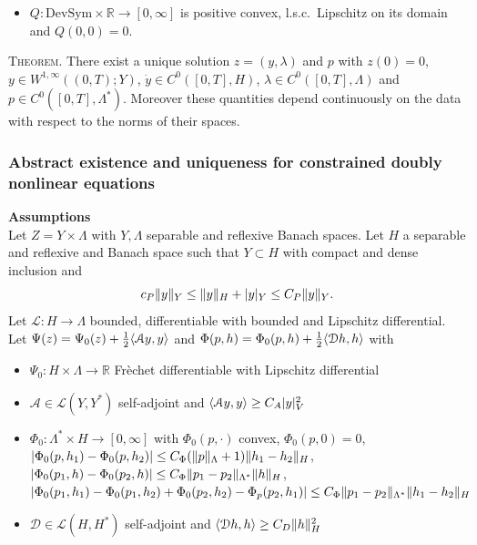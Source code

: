 \documentclass[8pt]{beamer}
\numberwithin{equation}{section}
\theoremstyle{definition}
\DeclarePairedDelimiter{\norm}{\lVert}{\rVert}
\DeclarePairedDelimiter{\dual}{\langle}{\rangle}
\begin{document}
\begin{frame}
{\begin{minipage}[c]{0.5\textwidth}
\begin{itemize}
\item[$\bullet$] $Q\colon\text{DevSym}\times\mathbb{R}\to[0,\infty]$ is positive convex, l.s.c.\, Lipschitz on its domain and $Q(0,0)=0$.
\end{itemize}
\vspace{0.5em}
\textsc{Theorem.} There exist a unique solution $z=(y,\lambda)$ and $p$ with $z(0)=0$, $y\in W^{1,\infty}((0,T);Y)$, $\dot y\in C^0([0,T],H)$, $\lambda\in C^0([0,T],\Lambda)$ and $p\in C^0([0,T],\Lambda^*)$. Moreover these quantities depend continuously on the data with respect to the norms of their spaces.
\end{minipage}
}
\end{frame}

\begin{frame}
\frametitle{Abstract existence and uniqueness for constrained doubly nonlinear equations}
\centering
\begin{minipage}[c]{0.7\textwidth}
\textbf{Assumptions}
\\[0.5ex]
Let $Z=Y\times\Lambda$ with $Y,\Lambda$ separable and reflexive Banach spaces. Let $H$ a separable and reflexive and Banach space such that $Y\subset H$ with compact and dense inclusion and
\[
c_P\norm{y}_Y\le\norm{y}_H+|y|_Y\le C_P\norm{y}_Y.
\]
Let $\mathscr{L}\colon H\to\Lambda$ bounded, differentiable with bounded and Lipschitz differential.
\\[0.5em]
Let $\Psi(z)=\Psi_0(z)+\frac{1}{2}\dual{\mathcal{A}y,y}$ and $\Phi(p,h)=\Phi_0(p,h)+\frac{1}{2}\dual{\mathcal{D}h,h}$ with
\begin{itemize}[itemsep=0.5em]
\item[$\bullet$]  $\Psi_0\colon H\times\Lambda\to\mathbb{R}$ Frèchet differentiable with Lipschitz differential
\item[$\bullet$] $\mathcal{A}\in\mathscr{L}(Y,Y^*)$ self-adjoint and $\dual{\mathcal{A}y,y}\ge C_A|y|_V^2$
\item[$\bullet$] $\Phi_0\colon\Lambda^*\times H\to[0,\infty]$ with $\Phi_0(p,\cdot)$ convex, $\Phi_0(p,0)=0$, $|\Phi_0(p,h_1)-\Phi_0(p,h_2)|\le C_\Phi(\norm{p}_\Lambda+1)\norm{h_1-h_2}_H$, $|\Phi_0(p_1,h)-\Phi_0(p_2,h)|\le C_\Phi\norm{p_1-p_2}_{\Lambda^*}\norm{h}_H$, $|\Phi_0(p_1,h_1)-\Phi_0(p_1,h_2)+\Phi_0(p_2,h_2)-\Phi_p(p_2,h_1)|\le C_\Phi\norm{p_1-p_2}_{\Lambda^*}\norm{h_1-h_2}_H$
\item[$\bullet$] $\mathcal{D}\in\mathscr{L}(H,H^*)$ self-adjoint and $\dual{\mathcal{D}h,h}\ge C_D\norm{h}_H^2$
\end{itemize}
\end{minipage}
\end{frame}
\end{document}
